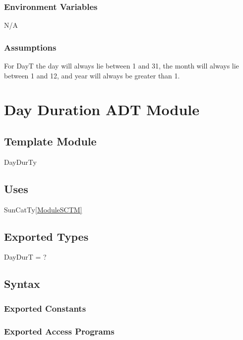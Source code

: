 \documentclass[12pt, titlepage]{article}
\begin{document}
\subsubsection{Environment Variables}

N/A\\

\subsubsection{Assumptions}
For DayT the day will always lie between 1 and 31, the month will always lie between 1 and 12, and year will always be greater than 1.

\section{Day Duration ADT Module} \label{ModuleADTD} 

\subsection{Template Module}
DayDurTy

\subsection{Uses}

SunCatTy\ref{ModuleSCTM} \\

\subsection{Exported Types}

DayDurT = ? \\

\subsection{Syntax}

\subsubsection{Exported Constants}


\subsubsection{Exported Access Programs}
\end{document}
